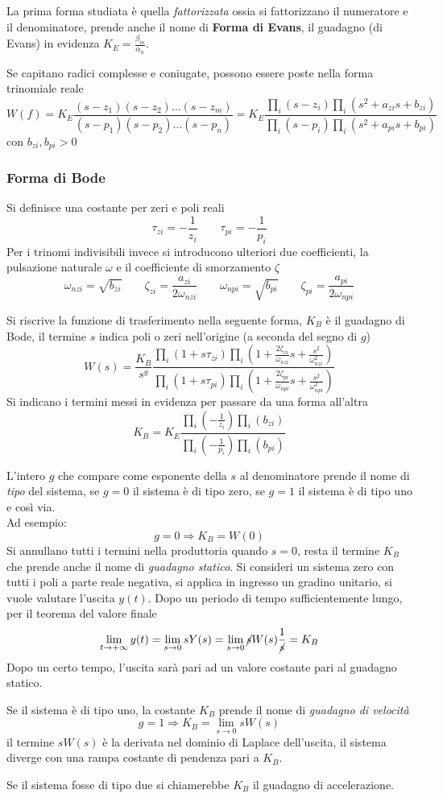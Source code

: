 La prima forma studiata è quella \textit{fattorizzata} ossia si fattorizzano
il numeratore e il denominatore, prende anche il nome di
\textbf{Forma di Evans}, il guadagno (di Evans) in evidenza
$K_E=\frac{\beta_m}{\alpha_n}$.

Se capitano radici complesse e coniugate, possono essere poste
nella forma trinomiale reale
$$
W(f) = K_E \frac{(s-z_1)(s-z_2)\ldots(s-z_m)}{(s-p_1)(s-p_2)\ldots(s-p_n)} =
K_E \frac{\prod_{i}(s-z_i)\prod_{i}(s^2 +a_{zi}s +
b_{zi})}{\prod_{i}(s-p_i)\prod_{i}(s^2 +a_{pi}s + b_{pi})}
$$
con $b_{zi},b_{pi}>0$

\newpage
\subsubsection{Forma di Bode}
Si definisce una costante per zeri e poli reali
$$
\tau_{zi} = -\frac{1}{z_i} \qquad \tau_{pi} = -\frac{1}{p_i}
$$
Per i trinomi indivisibili invece si introducono ulteriori due coefficienti, la
pulsazione naturale $\omega$ e il coefficiente di smorzamento $\zeta$
$$
\omega_{nzi} = \sqrt{b_{zi}} \qquad \zeta_{zi} =
\frac{a_{zi}}{2\omega_{nzi}} \qquad \omega_{npi} = \sqrt{b_{pi}} \qquad
\zeta_{pi} =
\frac{a_{pi}}{2\omega_{npi}}
$$

Si riscrive la funzione di trasferimento nella seguente forma, $K_B$ è il
guadagno di Bode, il termine $s$ indica poli o zeri nell'origine (a seconda del
segno di $g$)
$$
W(s) = \frac{K_B}{s^g}\frac{\prod_i (1+s\tau_{zi})
\prod_i\left(1+\frac{2\zeta_{zi}}{\omega_{nzi}}s + \frac{s^2}{\omega_{nzi}^2}
\right)}{ \prod_i (1+s\tau_{pi})
\prod_i\left(1+\frac{2\zeta_{pi}}{\omega_{npi}}s + \frac{s^2}{\omega_{npi}^2}
\right)  }
$$
Si indicano i termini messi in evidenza per passare da una forma all'altra
$$
K_B = K_E\frac{\prod_i\left(-\frac{1}{z_i}\right)\prod_i\left(b_{zi} \right)}
{\prod_i\left(-\frac{1}{p_i}\right)\prod_i\left(b_{pi} \right)}
$$

L'intero $g$ che compare come esponente della $s$ al denominatore prende il
nome di \textit{tipo} del sistema, se $g=0$ il sistema è di tipo zero, se $g=1$
il sistema è di tipo uno e così via.\\
Ad esempio:
$$
g=0 \Rightarrow K_B = W(0)
$$
Si annullano tutti i termini nella produttoria quando $s=0$, resta il termine
$K_B$ che prende anche il nome di \textit{guadagno statico}.
Si consideri un sistema zero con tutti i poli a parte reale negativa, si
applica in ingresso un gradino unitario, si vuole valutare l'uscita $y(t)$.
Dopo un periodo di tempo sufficientemente lungo, per il teorema del valore
finale
$$
\lim_{t\to +\infty} y(t) = \lim_{s\to 0} sY(s) = \lim_{s\to 0}
\cancel{s}W(s)\frac{1}{\cancel{s}} = K_B
$$
Dopo un certo tempo, l'uscita sarà pari ad un valore costante pari al guadagno
statico.

Se il sistema è di tipo uno, la costante $K_B$ prende il nome di
\textit{guadagno di velocità}
$$
g=1 \Rightarrow K_B = \lim_{s\to 0} sW(s)
$$
il termine $sW(s)$ è la derivata nel dominio di Laplace dell'uscita, il sistema
diverge con una rampa costante di pendenza pari a $K_B$.

Se il sistema fosse di tipo due si chiamerebbe $K_B$ il guadagno di
accelerazione.
